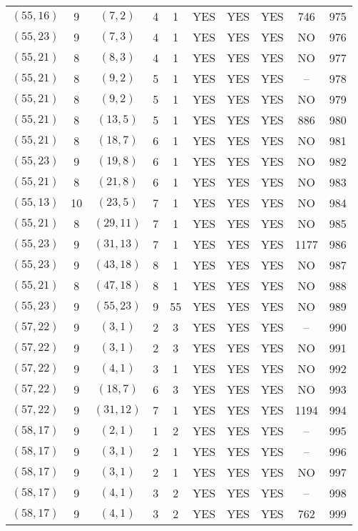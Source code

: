 \begin{longtable}{|c|c|c|c|c|c|c|c|c|c|}
$(55, 16)$ & 9 & $(7, 2)$ & 4 & 1 & YES & YES & YES & 746 & 975\\
$(55, 23)$ & 9 & $(7, 3)$ & 4 & 1 & YES & YES & YES & NO & 976\\
$(55, 21)$ & 8 & $(8, 3)$ & 4 & 1 & YES & YES & YES & NO & 977\\
$(55, 21)$ & 8 & $(9, 2)$ & 5 & 1 & YES & YES & YES & -- & 978\\
$(55, 21)$ & 8 & $(9, 2)$ & 5 & 1 & YES & YES & YES & NO & 979\\
$(55, 21)$ & 8 & $(13, 5)$ & 5 & 1 & YES & YES & YES & 886 & 980\\
$(55, 21)$ & 8 & $(18, 7)$ & 6 & 1 & YES & YES & YES & NO & 981\\
$(55, 23)$ & 9 & $(19, 8)$ & 6 & 1 & YES & YES & YES & NO & 982\\
$(55, 21)$ & 8 & $(21, 8)$ & 6 & 1 & YES & YES & YES & NO & 983\\
$(55, 13)$ & 10 & $(23, 5)$ & 7 & 1 & YES & YES & YES & NO & 984\\
$(55, 21)$ & 8 & $(29, 11)$ & 7 & 1 & YES & YES & YES & NO & 985\\
$(55, 23)$ & 9 & $(31, 13)$ & 7 & 1 & YES & YES & YES & 1177 & 986\\
$(55, 23)$ & 9 & $(43, 18)$ & 8 & 1 & YES & YES & YES & NO & 987\\
$(55, 21)$ & 8 & $(47, 18)$ & 8 & 1 & YES & YES & YES & NO & 988\\
$(55, 23)$ & 9 & $(55, 23)$ & 9 & 55 & YES & YES & YES & NO & 989\\
$(57, 22)$ & 9 & $(3, 1)$ & 2 & 3 & YES & YES & YES & -- & 990\\
$(57, 22)$ & 9 & $(3, 1)$ & 2 & 3 & YES & YES & YES & NO & 991\\
$(57, 22)$ & 9 & $(4, 1)$ & 3 & 1 & YES & YES & YES & NO & 992\\
$(57, 22)$ & 9 & $(18, 7)$ & 6 & 3 & YES & YES & YES & NO & 993\\
$(57, 22)$ & 9 & $(31, 12)$ & 7 & 1 & YES & YES & YES & 1194 & 994\\
$(58, 17)$ & 9 & $(2, 1)$ & 1 & 2 & YES & YES & YES & -- & 995\\
$(58, 17)$ & 9 & $(3, 1)$ & 2 & 1 & YES & YES & YES & -- & 996\\
$(58, 17)$ & 9 & $(3, 1)$ & 2 & 1 & YES & YES & YES & NO & 997\\
$(58, 17)$ & 9 & $(4, 1)$ & 3 & 2 & YES & YES & YES & -- & 998\\
$(58, 17)$ & 9 & $(4, 1)$ & 3 & 2 & YES & YES & YES & 762 & 999\\

\end{longtable}
